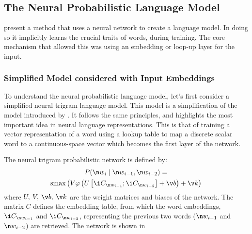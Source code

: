 {\subsection{The Neural Probabilistic Language Model}\label{sec:the-neural-probabilistic-language-model}

 present a method that uses a neural network to create a language model.
In doing so it implicitly learns the crucial traits of words, during training.
The core mechanism that allowed this was using an embedding or loop-up layer for the input.




\subsubsection{Simplified Model considered with Input Embeddings}
To understand the neural probabilistic language model, let's first consider a simplified neural trigram language model.
This model is a simplification of the model introduced by \textcite{NPLM}.
It follows the same principles, and highlights the most important idea in neural language representations.
This is that of training a vector representation of a word using a lookup table to map a discrete scalar word to a continuous-space vector which  becomes the first layer of the network.



The  neural trigram probabilistic network is defined by:
%
\begin{multline}
P(\n w_i \mid \n w_{i-1}, \n w_{i-2}) = \\
\softmax\left(V\varphi\left(U\left[\i C_{\n w_{i-1}}; \i C_{\n w_{i-2}}\right] + \v b \right) + \v k \right)
\end{multline}
%
where $U,\: V,\: \v b,\: \v k$ are the weight matrices and biases of the network.
The matrix $C$ defines the embedding table, 
from which the word embeddings, $\i C_{\n w_{i-1}}$ and $\i C_{\n w_{i-2}}$, representing the previous two words ($\n w_{i-1}$ and $\n w_{i-2}$) are retrieved.
The network is shown in 

}
